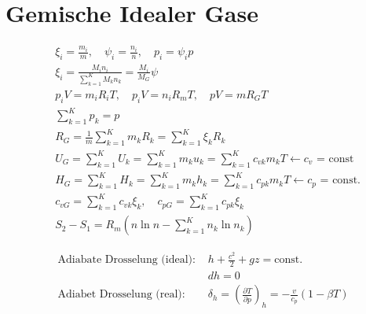 \documentclass[twocolumn]{article}
\begin{document}
\section{Gemische Idealer Gase}

\begin{align*}
	&\xi_i = \frac{m_i}{m}, \quad \psi_i = \frac{n_i}{n}, \quad p_i = \psi_ip \\
	&\xi_i = \frac{M_i n_i}{\sum_{k = 1}^{K} M_kn_k} = \frac{M_i}{M_G}\psi  \\
	& p_iV = m_iR_iT, \quad p_iV = n_iR_mT, \quad pV = mR_GT \\
	& \sum_{k = 1}^{K} p_k = p \\
	&R_G = \frac{1}{m} \sum_{k=1}^{K} m_kR_k = \sum_{k=1}^{K} \xi_k R_k \\
	&U_G = \sum_{k=1}^{K} U_k = \sum_{k=1}^{K} m_k u_k = \sum_{k=1}^{K} c_{vk}m_kT \leftarrow \text{$c_v$ = const}\\
	&H_G = \sum_{k=1}^{K} H_k = \sum_{k=1}^{K} m_k h_k = \sum_{k=1}^{K} c_{pk}m_kT \leftarrow \text{$c_p$ = const.}\\
	&c_{vG} = \sum_{k=1}^{K} c_{vk} \xi_k, \quad c_{pG} = \sum_{k=1}^{K} c_{pk}\xi_k \\
	&S_2-S_1 = R_m \left( n \ln n - \sum_{k=1}^{K} n_k \ln n_k \right)
\end{align*}

\begin{align*}
	\text{Adiabate Drosselung (ideal): } &h + \frac{c^2}{2} + gz = \text{const.} \\
	&dh = 0 \\
	\text{Adiabet Drosselung (real): } &\delta_h = \left(\frac{\partial T}{\partial p}\right)_{h}  = - \frac{v}{c_p}(1-\beta T) \\
\end{align*}
\end{document}
